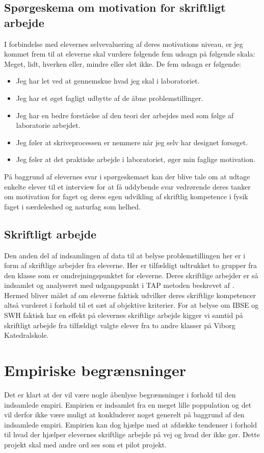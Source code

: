 \subsection{Spørgeskema om motivation for skriftligt arbejde}
\label{sub:3.2.a}
I forbindelse med elevernes selvevaluering af deres motivations niveau, er jeg kommet frem til at eleverne skal vurdere følgende fem udsagn på følgende skala: Meget, lidt, hverken eller, mindre eller slet ikke. De fem udsagn er følgende:
\begin{itemize}
	\item Jeg har let ved at gennemskue hvad jeg skal i laboratoriet.
 	\item Jeg har et øget fagligt udbytte af de åbne problemstillinger.
	\item Jeg har en bedre forståelse af den teori der arbejdes med som følge af laboratorie arbejdet.
	\item Jeg føler at skriveprocessen er nemmere når jeg selv har designet forsøget.
	\item Jeg føler at det praktiske arbejde i laboratoriet, øger min faglige motivation.
\end{itemize}
På baggrund af elevernes svar i spørgeskemaet kan der blive tale om at udtage enkelte elever til et interview for at få uddybende svar vedrørende deres tanker om motivation for faget og deres egen udvikling af skriftlig kompetence i fysik faget i særdeleshed og naturfag som helhed.

\subsection{Skriftligt arbejde}
\label{sub:3.2.b}
Den anden del af indsamlingen af data til at belyse problemstillingen her er i form af skriftlige arbejder fra eleverne. Her er tilfældigt udtrukket to grupper fra den klasse som er omdrejningspunktet for eleverne. Deres skriftlige arbejder er så indsamlet og analyseret med udgangspunkt i TAP metoden beskrevet af \citep{Erduran2004}. Hermed bliver målet af om eleverne faktisk udvilker deres skriftlige kompetencer altså vurderet i forhold til et sæt af objektive kriterier. 
For at belyse om IBSE og SWH faktisk har en effekt på elevernes skriftlige arbejde kigger vi samtid på skriftligt arbejde fra tilfældigt valgte elever fra to andre klasser på Viborg Katedralskole.

\section{Empiriske begrænsninger}
\label{sec:3.3}
Det er klart at der vil være nogle åbenlyse begrænsninger i forhold til den indsamlede empiri. Empirien er indsamlet fra en meget lille poppulation og det vil derfor ikke være muligt at konkluderer noget generelt på baggrund af den indsamlede empiri. Empirien kan dog hjælpe med at afdække tendenser i forhold til hvad der hjælper elevernes skriftlige arbejde på vej og hvad der ikke gør. Dette projekt skal med andre ord ses som et pilot projekt. 

